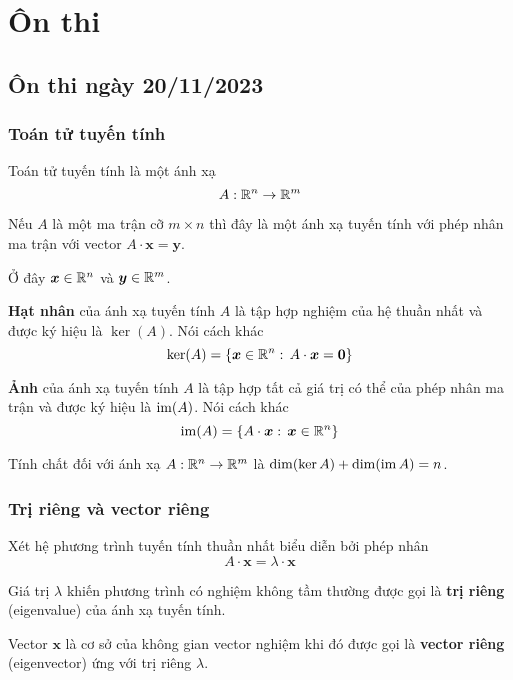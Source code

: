 \chapter{Ôn thi}

\section{Ôn thi ngày 20/11/2023}

\subsection*{Toán tử tuyến tính}

Toán tử tuyến tính là một ánh xạ \[ A: \mathbb{R}^n \to \mathbb{R}^m \]

Nếu $A$ là một ma trận cỡ $m \times n$ thì đây là một ánh xạ tuyến tính với phép nhân ma trận với vector $A \cdot \bm{x} = \bm{y}$.

Ở đây $\bm{x} \in \mathbb{R}^n$ và $\bm{y} \in \mathbb{R}^m$.

\begin{definition}
    \textbf{Hạt nhân} của ánh xạ tuyến tính $A$ là tập hợp nghiệm của hệ thuần nhất và được ký hiệu là $\ker(A)$. Nói cách khác
    \begin{equation}
        \ker(A) = \{ \bm{x} \in \mathbb{R}^n: \, A \cdot \bm{x} = \bm{0} \}
    \end{equation}
\end{definition}

\begin{definition}[Ảnh]
    \textbf{Ảnh} của ánh xạ tuyến tính $A$ là tập hợp tất cả giá trị có thể của phép nhân ma trận và được ký hiệu là $\operatorname{im}(A)$. Nói cách khác
    \begin{equation}
        \operatorname{im}(A) = \{ A \cdot \bm{x}: \, \bm{x} \in \mathbb{R}^n \}
    \end{equation}
\end{definition}

Tính chất đối với ánh xạ $A: \mathbb{R}^n \to \mathbb{R}^m$ là $\dim(\ker A) + \dim(\operatorname{im} A) = n$.

\subsection*{Trị riêng và vector riêng}

\begin{definition}
    Xét hệ phương trình tuyến tính thuần nhất biểu diễn bởi phép nhân \[ A \cdot \bm{x} = \lambda \cdot \bm{x} \]

    Giá trị $\lambda$ khiến phương trình có nghiệm không tầm thường được gọi là \textbf{trị riêng} (eigenvalue) của ánh xạ tuyến tính.

    Vector $\bm{x}$ là cơ sở của không gian vector nghiệm khi đó được gọi là \textbf{vector riêng} (eigenvector) ứng với trị riêng $\lambda$.
\end{definition}

